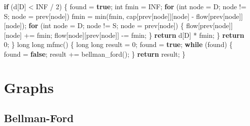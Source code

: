 \documentclass[10pt,]{article}
\newenvironment{Shaded}{}{}
\newcommand{\KeywordTok}[1]{\textcolor[rgb]{0.00,0.44,0.13}{\textbf{{#1}}}}
\newcommand{\DataTypeTok}[1]{\textcolor[rgb]{0.56,0.13,0.00}{{#1}}}
\newcommand{\DecValTok}[1]{\textcolor[rgb]{0.25,0.63,0.44}{{#1}}}
\newcommand{\NormalTok}[1]{{#1}}
\begin{document}
\begin{Shaded}
\begin{Highlighting}[]
  \KeywordTok{if} \NormalTok{(d[D] < INF / }\DecValTok{2}\NormalTok{) \{}
    \NormalTok{found = }\KeywordTok{true}\NormalTok{;}
    \DataTypeTok{int} \NormalTok{fmin = INF;}
    \KeywordTok{for} \NormalTok{(}\DataTypeTok{int} \NormalTok{node = D; node != S; node = prev[node])}
      \NormalTok{fmin = min(fmin, cap[prev[node]][node] - flow[prev[node]][node]);}
    \KeywordTok{for} \NormalTok{(}\DataTypeTok{int} \NormalTok{node = D; node != S; node = prev[node]) \{}
      \NormalTok{flow[prev[node]][node] += fmin;}
      \NormalTok{flow[node][prev[node]] -= fmin;}
    \NormalTok{\}}
    \KeywordTok{return} \NormalTok{d[D] * fmin;}
  \NormalTok{\}}
  \KeywordTok{return} \DecValTok{0}\NormalTok{;}
\NormalTok{\}}
\DataTypeTok{long} \DataTypeTok{long} \NormalTok{mfmc() \{}
  \DataTypeTok{long} \DataTypeTok{long} \NormalTok{result = }\DecValTok{0}\NormalTok{;}
  \NormalTok{found = }\KeywordTok{true}\NormalTok{;}
  \KeywordTok{while} \NormalTok{(found) \{}
    \NormalTok{found = }\KeywordTok{false}\NormalTok{;}
    \NormalTok{result += bellman_ford();}
  \NormalTok{\}}
  \KeywordTok{return} \NormalTok{result;}
\NormalTok{\}}
\end{Highlighting}
\end{Shaded}

\section{Graphs}

\subsection{Bellman-Ford}
\end{document}
